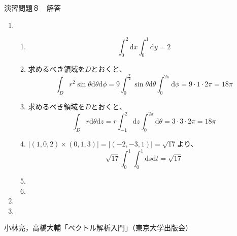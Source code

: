 \documentclass{jarticle}
\def\d{\mathrm d}
\begin{document}
\begin{center} {\Large 演習問題８　解答} \end{center}
\begin{enumerate}
  \item
    \begin{enumerate}
      \item
        \[ \int_0^2 \d x \int_0^1 \d y = 2 \]
      \item
        求めるべき領域を$D$とおくと、
        \[ \int_D r^2 \sin \theta \d \theta \d \phi = 9 \int_0^{\frac{\pi}{2}} \sin \theta \d \theta \int_0^{2\pi} \d \phi = 9 \cdot 1 \cdot 2 \pi = 18 \pi \]
      \item
        求めるべき領域を$D$とおくと、
        \[ \int_D r \d \theta \d z = r \int_{-1}^2 \d z \int_0^{2\pi} \d \theta = 3 \cdot 3 \cdot 2 \pi = 18 \pi \]
      \item
        $|(1,0,2) \times (0,1,3)| = |(-2,-3,1)| = \sqrt{17}$より、
        \[ \sqrt{17} \int_0^1 \int_0^1 \d s \d t = \sqrt{17} \]
      \item
      \item
    \end{enumerate}
  \item
  \item
\end{enumerate}
  \newpage
\begin{thebibliography}{99}
 小林亮，高橋大輔「ベクトル解析入門」（東京大学出版会）

\end{thebibliography}
\end{document}
